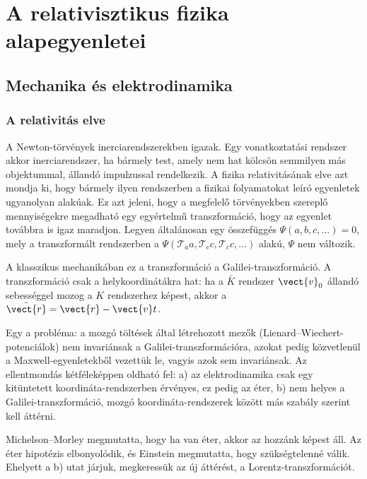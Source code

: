 \chapter{A relativisztikus fizika alapegyenletei}\label{2tetel}
 
 \section{Mechanika és elektrodinamika}
  
  \subsection{A relativitás elve}
   
   A Newton-törvények inerciarendszerekben igazak.
   Egy vonatkoztatási rendszer akkor inerciarendszer, ha bármely test, amely nem hat kölcsön semmilyen más objektummal, állandó impulzussal rendelkezik.
   A fizika relativitásának elve azt mondja ki, hogy bármely ilyen rendszerben a fizikai folyamatokat leíró egyenletek ugyanolyan alakúak.
   Ez azt jeleni, hogy a megfelelő törvényekben szereplő mennyiségekre megadható egy egyértelmű transzformáció, hogy az egyenlet továbbra is igaz maradjon.
   Legyen általánosan egy összefüggés $\Psi(a,b,c,\dots)=0$, mely a transzformált rendszerben a $\Psi(\mathcal{T}_{a}a,\mathcal{T}_{c}c,\mathcal{T}_{c}c,\dots)$ alakú, $\Psi$ nem változik.
   
   A klasszikus mechanikában ez a transzformáció a Galilei-transzformáció.
   A transzformáció csak a helykoordinátákra hat: ha a $\bar{K}$ rendszer $\vect{v}_0$ állandó sebességgel mozog a $K$ rendszerhez képest, akkor a $\bar{\vect{r}}=\vect{r}-\vect{v}t$. 
  
   Egy a probléma: a mozgó töltések által létrehozott mezők (Lienard--Wiechert-potenciálok) nem invariánsak a Galilei-transzformációra, azokat pedig közvetlenül a Maxwell-egyenletekből vezettük le, vagyis azok sem invariánsak.
   Az ellentmondás kétféleképpen oldható fel: a) az elektrodinamika csak egy kitüntetett koordináta-rendszerben érvényes, ez pedig az éter, b) nem helyes a Galilei-transzformáció, mozgó koordináta-rendszerek között más szabály szerint kell áttérni. 
  
   Michelson--Morley megmutatta, hogy ha van éter, akkor az hozzánk képest áll.
   Az éter hipotézis elbonyolódik, és Einstein megmutatta, hogy szükségtelenné válik.
   Ehelyett a b) utat járjuk, megkeressük az új áttérést, a Lorentz-transzformációt.
      
